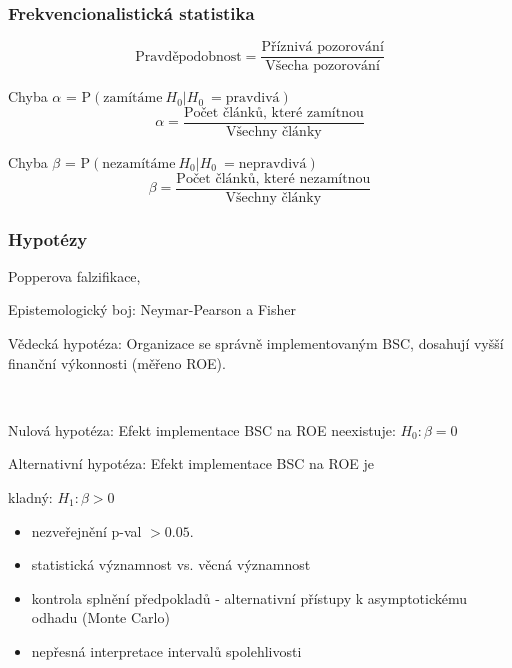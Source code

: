 \documentclass[10pt,xcolor={dvipsnames}]{beamer}
\begin{document}

\begin{frame}[fragile]
\frametitle{Frekvencionalistická statistika}
\begin{large}
\[\text{Pravděpodobnost} = \frac{\text{Příznivá pozorování}}{\text{Všecha pozorování}}\]\bigskip

\textcolor{WildStrawberry}{Chyba $\alpha$ = $\text{P}\left(\text{zamítáme}\ H_0 | H_0\ =\text{pravdivá} \right)$\bigskip
\[\alpha = \frac{\text{Počet článků, které zamítnou}}{\text{Všechny články}}\]}

\textcolor{NavyBlue}{Chyba $\beta$ = $\text{P}\left(\text{nezamítáme}\ H_0 | H_0\ =\text{nepravdivá} \right)$\bigskip
\[\beta = \frac{\text{Počet článků, které nezamítnou}}{\text{Všechny články}}\]}

\end{large}
\end{frame}


\begin{frame}
\frametitle{Hypotézy}
\begin{large}
\begin{itemize}
\item[--] Popperova falzifikace,
\item[--] Epistemologický boj: Neymar-Pearson a Fisher \\
\textcolor{WildStrawberry}{\item[--] Vědecká hypotéza: Organizace se správně implementovaným BSC, dosahují vyšší finanční výkonnosti (měřeno ROE).}\\
\textcolor{NavyBlue}{\item[--] Nulová hypotéza: Efekt implementace BSC na ROE neexistuje: $H_0: \beta = 0$ } 
\textcolor{NavyBlue}{\item[--] Alternativní hypotéza: Efekt implementace BSC na ROE je }\textcolor{WildStrawberry}{kladný}\textcolor{NavyBlue}{: $H_1: \beta > 0$ } 
\end{itemize}
\end{large}
\end{frame}



\begin{frame}
\begin{large}

\begin{itemize}
\item[--] nezveřejnění p-val $>0.05$.
\item[--] statistická významnost vs. věcná významnost
\item[--] kontrola splnění předpokladů - alternativní přístupy k asymptotickému odhadu (Monte Carlo)
\item[--] nepřesná interpretace intervalů spolehlivosti
\end{itemize}
\end{large}
\end{frame}
\end{document}
